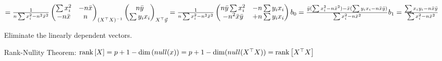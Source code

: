 \documentclass[12pt]{article}
\begin{document}
\begin{enumerate}
$=\frac{1}{n \sum x_i^2 - n^2 \bar{x}^2}\begin{pmatrix}
\sum x_i^2 & -n\bar{x}\\ -n \bar{x} & n
\end{pmatrix}_ {(X^\top X)^{-1}}
\begin{pmatrix}
n\bar{y}\\\sum y_i x_i
\end{pmatrix}_{X^\top \vec{y}}
= \frac{1}{n \sum x_i^2 - n^2 \bar{x}^2}
\begin{pmatrix}
n \bar{y} \sum x_i^2 & - n \sum y_i x_i\\ -n^2 \bar{x} \bar{y} & + n \sum y_i x_i
\end{pmatrix}\\
b_0 = \frac{\bar{y}(\sum x_i^2-n\bar{x}^2) - \bar{x} (\sum y_i x_i -n \bar{x}\bar{y} )}{\sum x_i^2 - n \bar{x}^2}\\
b_1 = \frac{\sum x_i y_i - n \bar{x} \bar{y}}{\sum x_i^2 -n\bar{x}^2}
$
\\

 

Eliminate the linearly dependent vectors.



Rank-Nullity Theorem: $\text{rank}\left[X\right] = p+1 - \dim{(null(x))} = p+1 - \dim(null(X^\top X)) = \text{rank}\left[X^\top X\right]$\\



\end{enumerate}
\end{document}
